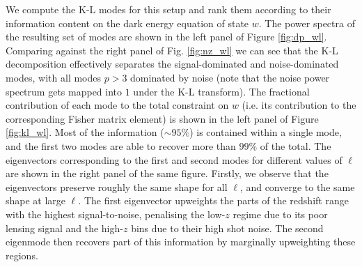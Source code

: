 \documentclass[twocolumn,amsfont,amssymb,amsmath, showpacs,balancelastpage, nofootinbib]{revtex4-1}
\begin{document}
    We compute the K-L modes for this setup and rank them according to their information content on the dark energy equation of state $w$. The power spectra of the resulting set of modes are shown in the left panel of Figure \ref{fig:dp_wl}. Comparing against the right panel of Fig. \ref{fig:nz_wl} we can see that the K-L decomposition effectively separates the signal-dominated and noise-dominated modes, with all modes $p>3$ dominated by noise (note that the noise power spectrum gets mapped into $1$ under the K-L transform). The fractional contribution of each mode to the total constraint on $w$ (i.e. its contribution to the corresponding Fisher matrix element) is shown in the left panel of Figure \ref{fig:kl_wl}. Most of the information ($\sim95\%$) is contained within a single mode, and the first two modes are able to recover more than $99\%$ of the total. The eigenvectors corresponding to the first and second modes for different values of $\ell$ are shown in the right panel of the same figure. Firstly, we observe that the eigenvectors preserve roughly the same shape for all $\ell$, and converge to the same shape at large $\ell$. The first eigenvector upweights the parts of the redshift range with the highest signal-to-noise, penalising the low-$z$ regime due to its poor lensing signal and the high-$z$ bins due to their high shot noise. The second eigenmode then recovers part of this information by marginally upweighting these regions.
\end{document}
